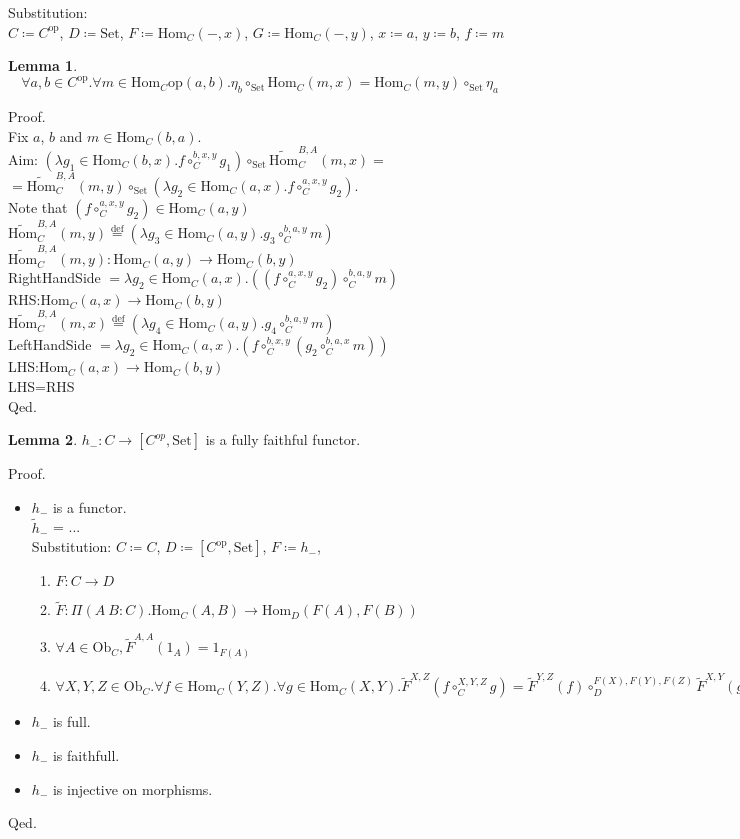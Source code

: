 \documentclass[10pt,a4paper]{article}
\theoremstyle{definition}
\newtheorem{lemma}{Lemma}[section]
\newcommand{\Ob}{{\mbox{Ob}}}
\newcommand{\Hom}{{\mbox{Hom}}}
\newcommand{\HomMor}{{\widetilde{\Hom}\mbox{}}}
\newcommand{\FMor}{{\widetilde{F}\mbox{}}}
\newcommand{\op}{{\mbox{op}}}
\newcommand{\defi}{{\mbox{def}}}
\newcommand{\eqdef}{{\stackrel{\defi}{=}}}
\newcommand{\Set}{{\mbox{Set}}}
\begin{document}
Substitution:\\
$C \coloneqq C^\op$, $D \coloneqq \Set$, $F \coloneqq \Hom_C(-,x)$, $G \coloneqq \Hom_C(-,y)$, $x \coloneqq a$, $y \coloneqq b$, $f \coloneqq m$
\begin{lemma}
$$\forall a,b\in C^\op. \forall m\in \Hom_C\op (a,b).\eta_b \circ_\Set \Hom_C(m,x)=\Hom_C(m,y)\circ_\Set\eta_a$$
\end{lemma}
\noindent Proof.\\
Fix $a$, $b$ and $m\in\Hom_C(b,a)$.\\
Aim: $(\lambda g_1 \in \Hom_C(b,x). f\circ^{b,x,y}_C g_1)\circ_\Set \HomMor_C^{B,A}(m,x) = $\\
$=\HomMor_C^{B,A}(m,y) \circ_\Set (\lambda g_2 \in \Hom_C(a,x). f\circ^{a,x,y}_C g_2)$.\\
Note that $(f\circ^{a,x,y}_C g_2) \in \Hom_C(a,y)$\\
$\HomMor_C^{B,A}(m,y) \eqdef (\lambda g_3 \in \Hom_C(a,y). g_3\circ^{b,a,y}_C m)$\\
$\HomMor_C^{B,A}(m,y) : \Hom_C(a,y) \to \Hom_C(b,y)$\\
RightHandSide $= \lambda g_2 \in \Hom_C(a,x). ((f \circ_C^{a,x,y} g_2) \circ_C^{b,a,y} m )$\\
RHS:$\Hom_C(a,x) \to \Hom_C(b,y)$\\
$\HomMor_C^{B,A}(m,x) \eqdef (\lambda g_4 \in \Hom_C(a,y). g_4\circ^{b,a,y}_C m)$\\
LeftHandSide $= \lambda g_2 \in \Hom_C(a,x). (f \circ_C^{b,x,y} (g_2 \circ_C^{b,a,x} m ))$\\
LHS:$\Hom_C(a,x) \to \Hom_C(b,y)$\\
LHS=RHS\\
Qed.
\begin{lemma}
$h_{-}:C\rightarrow [C^{op},\Set]$ is a fully faithful functor.
\end{lemma}
\noindent Proof.
\begin{itemize}
\item $h_-$ is a functor.\\
$\widetilde{h}_-$ = ...\\
Substitution: $C\coloneqq C$, $D\coloneqq [C^\op,\Set]$, $F\coloneqq h_-$,
\begin{enumerate}
\item $F:C \to D$
\item $\FMor:\Pi(A\ B:C).\Hom_C(A,B) \to \Hom_D(F(A), F(B))$
\item $\forall A\in \Ob_C, \FMor^{A,A}(1_A)=1_{F(A)}$
\item $\forall X,Y,Z \in \Ob_C.\forall f\in\Hom_C(Y,Z).\forall g\in\Hom_C(X,Y). \FMor^{X,Z}(f\circ_C^{X,Y,Z} g)=\FMor^{Y,Z}(f)\circ_D^{F(X),F(Y),F(Z)} \FMor^{X,Y}(g)$
\end{enumerate}
\item $h_-$ is full.
\item $h_-$ is faithfull.
\item $h_-$ is injective on morphisms.
\end{itemize}
Qed.\\
\end{document}
